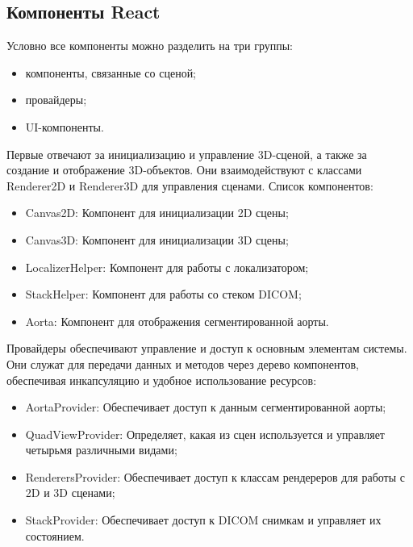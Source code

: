 \subsection{Компоненты React}

Условно все компоненты можно разделить на три группы:
\begin{itemize}
    \item компоненты, связанные со сценой;
    \item провайдеры;
    \item UI-компоненты.
\end{itemize}

Первые отвечают за инициализацию и управление 3D-сценой, а также за создание и отображение 3D-объектов. Они взаимодействуют с классами Renderer2D и Renderer3D для управления сценами. Список компонентов:
\begin{itemize}
    \item Canvas2D: Компонент для инициализации 2D сцены;
    \item Canvas3D: Компонент для инициализации 3D сцены;
    \item LocalizerHelper: Компонент для работы с локализатором;
    \item StackHelper: Компонент для работы со стеком DICOM;
    \item Aorta: Компонент для отображения сегментированной аорты.
\end{itemize}

Провайдеры обеспечивают управление и доступ к основным элементам системы. Они служат для передачи данных и методов через дерево компонентов, обеспечивая инкапсуляцию и удобное использование ресурсов:
\begin{itemize}
    \item AortaProvider: Обеспечивает доступ к данным сегментированной аорты;
    \item QuadViewProvider: Определяет, какая из сцен используется и управляет четырьмя различными видами;
    \item RenderersProvider: Обеспечивает доступ к классам рендереров для работы с 2D и 3D сценами;
    \item StackProvider: Обеспечивает доступ к DICOM снимкам и управляет их состоянием.
\end{itemize}

